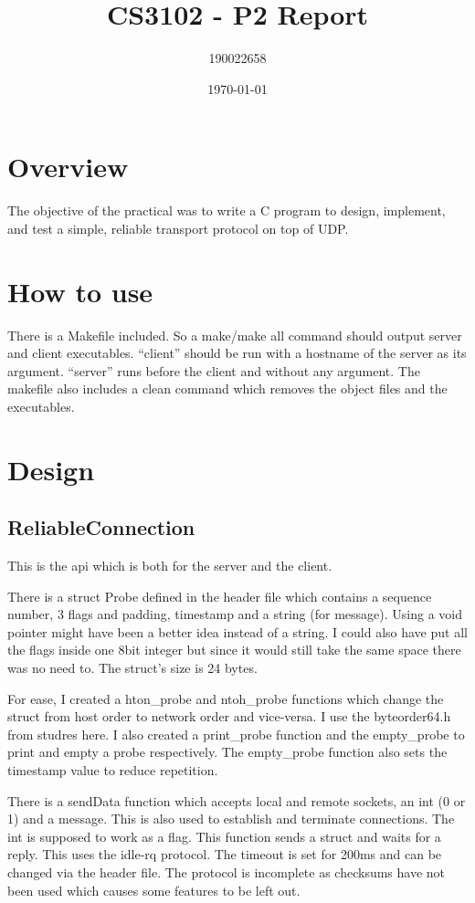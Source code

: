 \documentclass[11pt]{article}
\author{190022658}
\date{\today}
\title{CS3102 - P2 Report}
\begin{document}
\maketitle

\section{Overview}
\label{sec:org50fa5f3}
The objective of the practical was to write a C program to design, implement, and test a simple, reliable transport protocol on top of UDP.

\section{How to use}
\label{sec:org22d72cf}
There is a Makefile included. So a make/make all command should output server and client executables. ``client'' should be run with a hostname of the server as its argument. ``server'' runs before the client and without any argument. The makefile also includes a clean command which removes the object files and the executables.

\section{Design}
\label{sec:org4a20084}
\subsection{ReliableConnection}
\label{sec:orgbef2c96}
This is the api which is both for the server and the client.

There is a struct Probe defined in the header file which contains a sequence number, 3 flags and padding, timestamp and a string (for message). Using a void pointer might have been a better idea instead of a string. I could also have put all the flags inside one 8bit integer but since it would still take the same space there was no need to. The struct's size is 24 bytes.

For ease, I created a hton\_probe and ntoh\_probe functions which change the struct from host order to network order and vice-versa. I use the byteorder64.h from studres here. I also created a print\_probe function and the empty\_probe to print and empty a probe respectively. The empty\_probe function also sets the timestamp value to reduce repetition.

There is a sendData function which accepts local and remote sockets, an int (0 or 1) and a message. This is also used to establish and terminate connections. The int is supposed to work as a flag. This function sends a struct and waits for a reply. This uses the idle-rq protocol. The timeout is set for 200ms and can be changed via the header file. The protocol is incomplete as checksums have not been used which causes some features to be left out.
\end{document}
